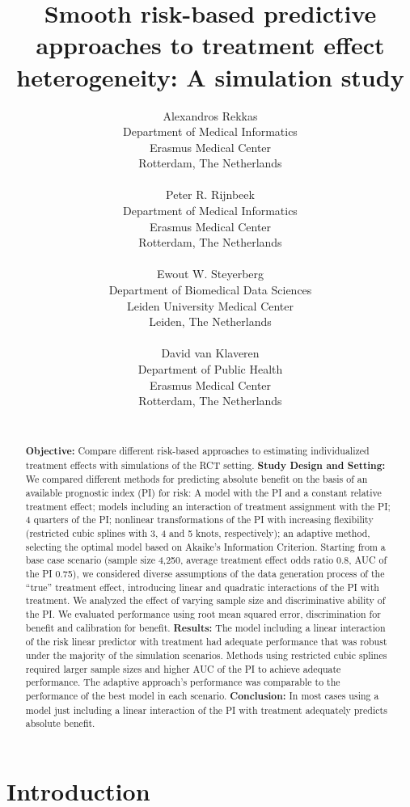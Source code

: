 \documentclass{article}
\title{Smooth risk-based predictive approaches to treatment effect
heterogeneity: A simulation study}
\author{
    Alexandros Rekkas
   \\
    Department of Medical Informatics \\
    Erasmus Medical Center \\
  Rotterdam, The Netherlands \\
  \texttt{} \\
   \And
    Peter R. Rijnbeek
   \\
    Department of Medical Informatics \\
    Erasmus Medical Center \\
  Rotterdam, The Netherlands \\
  \texttt{} \\
   \And
    Ewout W. Steyerberg
   \\
    Department of Biomedical Data Sciences \\
    Leiden University Medical Center \\
  Leiden, The Netherlands \\
  \texttt{} \\
   \And
    David van Klaveren
   \\
    Department of Public Health \\
    Erasmus Medical Center \\
  Rotterdam, The Netherlands \\
  \texttt{} \\
  }
\date{}
\begin{document}
\maketitle

\def\tightlist{}


\begin{abstract}
\textbf{Objective:} Compare different risk-based approaches to
estimating individualized treatment effects with simulations of the RCT
setting. \textbf{Study Design and Setting:} We compared different
methods for predicting absolute benefit on the basis of an available
prognostic index (PI) for risk: A model with the PI and a constant
relative treatment effect; models including an interaction of treatment
assignment with the PI; 4 quarters of the PI; nonlinear transformations
of the PI with increasing flexibility (restricted cubic splines with 3,
4 and 5 knots, respectively); an adaptive method, selecting the optimal
model based on Akaike's Information Criterion. Starting from a base case
scenario (sample size 4,250, average treatment effect odds ratio 0.8,
AUC of the PI 0.75), we considered diverse assumptions of the data
generation process of the ``true'' treatment effect, introducing linear
and quadratic interactions of the PI with treatment. We analyzed the
effect of varying sample size and discriminative ability of the PI. We
evaluated performance using root mean squared error, discrimination for
benefit and calibration for benefit. \textbf{Results:} The model
including a linear interaction of the risk linear predictor with
treatment had adequate performance that was robust under the majority of
the simulation scenarios. Methods using restricted cubic splines
required larger sample sizes and higher AUC of the PI to achieve
adequate performance. The adaptive approach's performance was comparable
to the performance of the best model in each scenario.
\textbf{Conclusion:} In most cases using a model just including a linear
interaction of the PI with treatment adequately predicts absolute
benefit.
\end{abstract}


\linenumbers

\hypertarget{introduction}{%
\section{Introduction}\label{introduction}}
\end{document}
